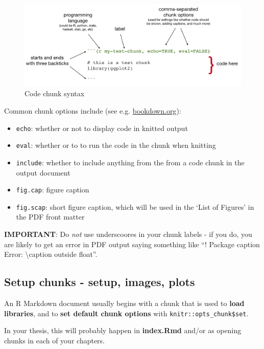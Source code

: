 \documentclass[a4paper,nobind]{templates/ociamthesis}
\providecommand{\tightlist}{%
  \setlength{\itemsep}{0pt}\setlength{\parskip}{0pt}}
\begin{document}
\begin{figure}[H]
\includegraphics[width=1\linewidth]{figures/sample-content/chunk-parts} \caption{Code chunk syntax}\label{fig:chunk-parts}
\end{figure}

Common chunk options include (see e.g.
\href{https://bookdown.org/yihui/rmarkdown/r-code.html}{bookdown.org}):

\begin{itemize}
\tightlist
\item
  \texttt{echo}: whether or not to display code in knitted output
\item
  \texttt{eval}: whether or to to run the code in the chunk when
  knitting
\item
  \texttt{include}: whether to include anything from the from a code
  chunk in the output document
\item
  \texttt{fig.cap}: figure caption
\item
  \texttt{fig.scap}: short figure caption, which will be used in the
  `List of Figures' in the PDF front matter
\end{itemize}

\textbf{IMPORTANT}: Do \emph{not} use underscoores in your chunk labels
- if you do, you are likely to get an error in PDF output saying
something like ``! Package caption Error: \textbackslash{}caption
outside float''.

\subsection{Setup chunks - setup, images,
plots}\label{setup-chunks---setup-images-plots}

An R Markdown document usually begins with a chunk that is used to
\textbf{load libraries}, and to \textbf{set default chunk options} with
\texttt{knitr::opts\_chunk\$set}.

In your thesis, this will probably happen in \textbf{index.Rmd} and/or
as opening chunks in each of your chapters.
\end{document}
